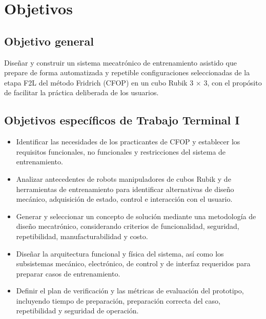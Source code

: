 \section{Objetivos}

\subsection{Objetivo general}
Diseñar y construir un sistema mecatrónico de entrenamiento asistido que prepare de forma automatizada y repetible configuraciones seleccionadas de la etapa F2L del método Fridrich (CFOP) en un cubo Rubik 3 × 3, con el propósito de facilitar la práctica deliberada de los usuarios.

\subsection{Objetivos específicos de Trabajo Terminal I}
\begin{itemize}
    \item Identificar las necesidades de los practicantes de CFOP y establecer los requisitos funcionales, no funcionales y restricciones del sistema de entrenamiento.

    \item Analizar antecedentes de robots manipuladores de cubos Rubik y de herramientas de entrenamiento para identificar alternativas de diseño mecánico, adquisición de estado, control e interacción con el usuario.

    \item Generar y seleccionar un concepto de solución mediante una metodología de diseño mecatrónico, considerando criterios de funcionalidad, seguridad, repetibilidad, manufacturabilidad y costo.

    \item Diseñar la arquitectura funcional y física del sistema, así como los subsistemas mecánico, electrónico, de control y de interfaz requeridos para preparar casos de entrenamiento.

    \item Definir el plan de verificación y las métricas de evaluación del prototipo, incluyendo tiempo de preparación, preparación correcta del caso, repetibilidad y seguridad de operación.
\end{itemize}

